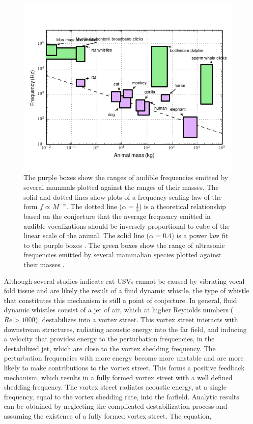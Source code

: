 \documentclass[twocolumn, prl]{revtex4}
\begin{document}
\begin{figure}
\begin{center}
\includegraphics[width=\columnwidth]{frequency_scaling.png}
\caption{\label{fig:frequency_scaling} The purple boxes show the ranges of audible frequencies emitted by several mammals plotted against the ranges of their masses. The solid and dotted lines show plots of a frequency scaling law of the form $f\propto M^{-\alpha}$. The dotted line ($\alpha=\frac{1}{3}$) is a theoretical relationship based on the conjecture that the average frequency emitted in audible vocalizations should be inversely proportional to cube of the linear scale of the animal. The solid line ($\alpha=0.4$) is a power law fit to the purple boxes \cite{Brudzynski2010}. The green boxes show the range of ultrasonic frequencies emitted by several mammalian species plotted against their masses \cite{white1998,berry1970natural,Fenton1998,Jones2006,bogdanowicz1994,Frankel2009,Whitehead2009}.}
\end{center}
\end{figure}
Although several studies indicate rat USVs cannot be caused by vibrating vocal fold tissue and are likely the result of a fluid dynamic whistle, the type of whistle that constitutes this mechanism is still a point of conjecture. In general, fluid dynamic whistles consist of a jet of air, which at higher Reynolds numbers ($Re>1000$), destabilizes into a vortex street. This vortex street interacts with downstream structures, radiating acoustic energy into the far field, and inducing a velocity that provides energy to the perturbation frequencies, in the destabilized jet, which are close to the vortex shedding frequency. The perturbation frequencies with more energy become more unstable and are more likely to make contributions to the vortex street. This forms a positive feedback mechanism, which results in a fully formed vortex street with a well defined shedding frequency. The vortex street radiates acoustic energy, at a single frequency, equal to the vortex shedding rate, into the farfield. Analytic results can be obtained by neglecting the complicated destabilization process and assuming the existence of a fully formed vortex street. The equation,
\end{document}
